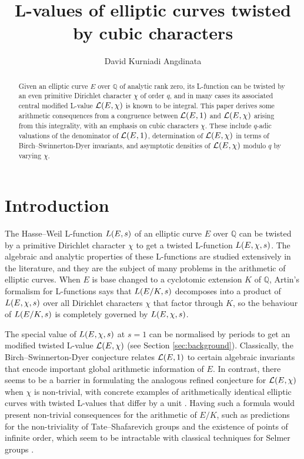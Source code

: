 \documentclass{article}
\title{L-values of elliptic curves twisted by cubic characters}
\author{David Kurniadi Angdinata}
\theoremstyle{plain}
\theoremstyle{definition}
\newcommand{\LLL}{\mathcal{L}}
\newcommand{\QQ}{\mathbb{Q}}
\newcommand{\br}{\!\del}
\begin{document}
\maketitle

\begin{abstract}
Given an elliptic curve $ E $ over $ \QQ $ of analytic rank zero, its L-function can be twisted by an even primitive Dirichlet character $ \chi $ of order $ q $, and in many cases its associated central modified L-value $ \LLL\br{E, \chi} $ is known to be integral. This paper derives some arithmetic consequences from a congruence between $ \LLL\br{E, 1} $ and $ \LLL\br{E, \chi} $ arising from this integrality, with an emphasis on cubic characters $ \chi $. These include $ q $-adic valuations of the denominator of $ \LLL\br{E, 1} $, determination of $ \LLL\br{E, \chi} $ in terms of Birch--Swinnerton-Dyer invariants, and asymptotic densities of $ \LLL\br{E, \chi} $ modulo $ q $ by varying $ \chi $.
\end{abstract}

\tableofcontents

\section{Introduction}

The Hasse--Weil L-function $ L\br{E, s} $ of an elliptic curve $ E $ over $ \QQ $ can be twisted by a primitive Dirichlet character $ \chi $ to get a twisted L-function $ L\br{E, \chi, s} $. The algebraic and analytic properties of these L-functions are studied extensively in the literature, and they are the subject of many problems in the arithmetic of elliptic curves. When $ E $ is base changed to a cyclotomic extension $ K $ of $ \QQ $, Artin's formalism for L-functions says that $ L\br[0]{E / K, s} $ decomposes into a product of $ L\br{E, \chi, s} $ over all Dirichlet characters $ \chi $ that factor through $ K $, so the behaviour of $ L\br[0]{E / K, s} $ is completely governed by $ L\br{E, \chi, s} $.

The special value of $ L\br{E, \chi, s} $ at $ s = 1 $ can be normalised by periods to get an modified twisted L-value $ \LLL\br{E, \chi} $ (see Section \ref{sec:background}). Classically, the Birch--Swinnerton-Dyer conjecture relates $ \LLL\br{E, 1} $ to certain algebraic invariants that encode important global arithmetic information of $ E $. In contrast, there seems to be a barrier in formulating the analogous refined conjecture for $ \LLL\br{E, \chi} $ when $ \chi $ is non-trivial, with concrete examples of arithmetically identical elliptic curves with twisted L-values that differ by a unit \cite[Section 4]{DEW21}. Having such a formula would present non-trivial consequences for the arithmetic of $ E / K $, such as predictions for the non-triviality of Tate--Shafarevich groups and the existence of points of infinite order, which seem to be intractable with classical techniques for Selmer groups \cite[Section 3]{DEW21}.
\end{document}
